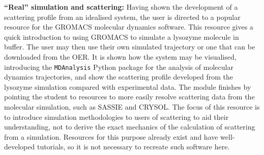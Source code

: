 \textbf{``Real'' simulation and scattering:} Having shown the development of a scattering profile from an idealised system, the user is directed to a popular resource for the GROMACS\autocite{berendsen_gromacs_1995} molecular dynamics software.
This resource gives a quick introduction to using GROMACS to simulate a lysozyme molecule in buffer.\autocite{lemkul_gromacs_nodate}
The user may then use their own simulated trajectory or one that can be downloaded from the OER.
It is shown how the system may be visualised, introducing the \texttt{MDAnalysis} Python package for the analysis of molecular dynamics trajectories,\autocite{michaud-agrawal_mdanalysis_2011,gowers_mdanalysis_2016} and show the scattering profile developed from the lysozyme simulation compared with experimental data.\autocite{franke_correlation_2015}
The module finishes by pointing the student to resources to more easily resolve scattering data from the molecular simulation, such as SASSIE and CRYSOL.\autocite{perkins_atomistic_2016,svergun_crysol_1995}
The focus of this resource is to introduce simulation methodologies to users of scattering to aid their understanding, not to derive the exact mechanics of the calculation of scattering from a simulation.
Resources for this purpose already exist and have well-developed tutorials, so it is not necessary to recreate such software here.
